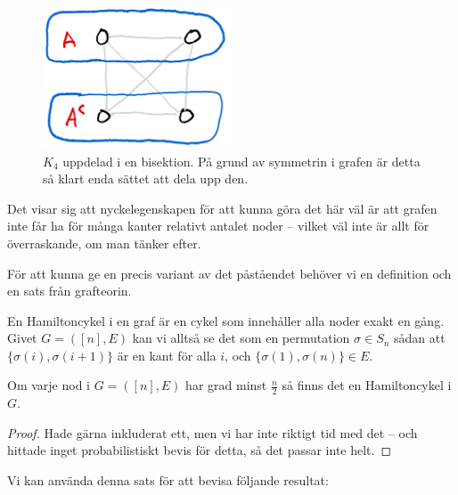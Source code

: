 \documentclass[nobib]{tufte-handout}
\begin{document}
\begin{figure}
  \centering
  \includegraphics[width=0.5\textwidth]{graphics/K4_min_bisection.png}
  \caption{$K_4$ uppdelad i en bisektion. På grund av symmetrin i grafen är detta så klart enda sättet att dela upp den.}
\end{figure}

Det visar sig att nyckelegenskapen för att kunna göra det här väl är att grafen inte får ha för många kanter relativt antalet noder -- vilket väl inte är allt för överraskande, om man tänker efter.

För att kunna ge en precis variant av det påståendet behöver vi en definition och en sats från grafteorin.

\begin{definition}
  En Hamiltoncykel i en graf är en cykel som innehåller alla noder exakt en gång. Givet $G = ([n],E)$ kan vi alltså se det som en permutation $\sigma \in S_n$ sådan att $\{\sigma(i),\sigma(i+1)\}$ är en kant för alla $i$, och $\{\sigma(1), \sigma(n)\} \in E$.
\end{definition}

\begin{theorem}
  Om varje nod i $G = ([n], E)$ har grad minst $\frac{n}{2}$ så finns det en Hamiltoncykel i $G$.

  \begin{proof}
    Hade gärna inkluderat ett, men vi har inte riktigt tid med det -- och hittade inget probabilistiskt bevis för detta, så det passar inte helt.
  \end{proof}
\end{theorem}

Vi kan använda denna sats för att bevisa följande resultat:
\end{document}
